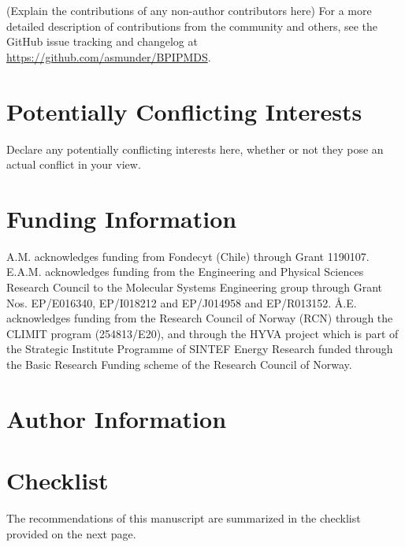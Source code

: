 \documentclass[9pt,bestpractices]{livecoms}
\newcommand{\githubrepository}{\url{https://github.com/asmunder/BPIPMDS}}  %
\begin{document}
(Explain the contributions of any non-author contributors here)
For a more detailed description of contributions from the community and others, see the GitHub issue tracking and changelog at \githubrepository.

\section{Potentially Conflicting Interests}

Declare any potentially conflicting interests here, whether or not they pose an actual conflict in your view.

\section{Funding Information}
A.M. acknowledges funding from Fondecyt (Chile) through Grant 1190107. E.A.M.
acknowledges funding from the Engineering and Physical Sciences Research
Council to the Molecular Systems Engineering group through Grant Nos.
EP/E016340, EP/I018212 and EP/J014958 and EP/R013152.
\AA{}.E. acknowledges funding from the Research Council of Norway (RCN) 
through the CLIMIT program (254813/E20), and through the HYVA project which 
is part of the Strategic Institute Programme of SINTEF Energy Research funded 
through the Basic Research Funding scheme of the Research Council of Norway.

\section*{Author Information}
\makeorcid
\section{Checklist}
\label{checklist}
The recommendations of this manuscript are summarized in the checklist provided on the next page.
\end{document}
